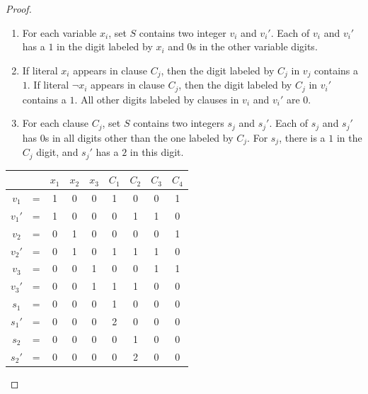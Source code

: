 \documentclass[letter]{book}
\theoremstyle{definition}
\theoremstyle{definition}
\theoremstyle{remark}
\begin{document}
\begin{proof}
\begin{enumerate}
\begin{enumerate}
\begin{enumerate}
                        \item For each variable $x_i$, set $S$ contains two integer $v_i$ and $v_i'$. Each of $v_i$ and $v_i'$ has a $1$ in the digit labeled by $x_i$ and $0$s in the other variable digits.
                        \item If literal $x_i$ appears in clause $C_j$, then the digit labeled by $C_j$ in $v_j$ contains a $1$. If literal $\lnot{x_i}$ appears in clause $C_j$, then the digit labeled by $C_j$ in $v_i'$ contains a $1$. All other digits labeled by clauses in $v_i$ and $v_i'$ are $0$.
                        \item For each clause $C_j$, set $S$ contains two integers $s_j$ and $s_j'$. Each of $s_j$ and $s_j'$ has $0$s in all digits other than the one labeled by $C_j$. For $s_j$, there is a $1$ in the $C_j$ digit, and $s_j'$ has a $2$ in this digit.
                    \end{enumerate}
                    \begin{table}[h]
                        \centering
                        \begin{tabular}{ccccccccc}
                              &   & $x_1$ & $x_2$ & $x_3$ & $C_1$ & $C_2$ & $C_3$ & $C_4$\\
                            \hline\hline
                            $v_1$ & = & 1 & 0 & 0 & 1 & 0 & 0 & 1\\
                            $v_1'$ & = & 1 & 0 & 0 & 0 & 1 & 1 & 0\\
                            \hline
                            $v_2$ & = & 0 & 1 & 0 & 0 & 0 & 0 & 1\\
                            $v_2'$ & = & 0 & 1 & 0 & 1 & 1 & 1 & 0\\
                            \hline
                            $v_3$ & = & 0 & 0 & 1 & 0 & 0 & 1 & 1\\
                            $v_3'$ & = & 0 & 0 & 1 & 1 & 1 & 0 & 0\\
                            \hline
                            $s_1$ & = & 0 & 0 & 0 & 1 & 0 & 0 & 0\\
                            $s_1'$ & = & 0 & 0 & 0 & 2 & 0 & 0 & 0\\
                            \hline
                            $s_2$ & = & 0 & 0 & 0 & 0 & 1 & 0 & 0\\
                            $s_2'$ & = & 0 & 0 & 0 & 0 & 2 & 0 & 0\\
                            \hline

\end{tabular}
\end{table}
\end{enumerate}
\end{enumerate}
\end{proof}
\end{document}
